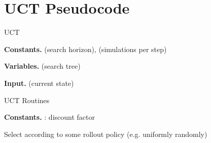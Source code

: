 \documentclass[twoside,11pt]{article}
\begin{document}
\newpage
\section{UCT Pseudocode}\label{appendix:uct_pseudocode}

\begin{algorithm}
\caption{UCT\label{algo:uct_algorithm}}
\begin{algorithmic}
\item[\textbf{Constants.}]  (search horizon),  (simulations per step)
\item[\textbf{Variables.}]  (search tree)
\item[\textbf{Input.}]  (current state)
\STATE

\item[]
  \STATE 
  \STATE 
\ENDIF
\REPEAT
  \STATE 
\UNTIL{}
\STATE 
\STATE  {}
\RETURN 

\STATE
\item[]
\STATE{}
    \STATE  {} 
    \STATE 
    \STATE 
    \STATE  {} 
  \ELSE
    \STATE 
    \STATE  
  \ENDIF
\ENDWHILE
\STATE 
\STATE  {}

\STATE
\item[]
\RETURN  {}

\STATE
\item[]
\STATE 

\end{algorithmic}
\end{algorithm}

\begin{algorithm}
\caption{UCT Routines\label{algo:uct_routines}}
\begin{algorithmic}
\item[\textbf{Constants.}]  : discount factor

\STATE
\item[]
  \STATE 
\ENDFOR
\RETURN 

\STATE
\item[]
\STATE  {}
\STATE 
\WHILE{}
  \STATE Select  according to some rollout policy (e.g. uniformly randomly)
  \STATE 
  \STATE 
  \STATE 
  \STATE 
\ENDWHILE
\RETURN  

\STATE
\item[]
\STATE  
\STATE 
\STATE 
{}
  \STATE 
\ENDIF
\end{algorithmic}
\end{algorithm}
\end{document}
